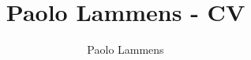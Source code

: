 \documentclass[a4paper, 11pt]{article}
\title{Paolo Lammens - CV}
\author{Paolo Lammens}
\begin{document}
\makeatletter

\newcommand{\ifnn}[2]{\ifthenelse{\equal{#1}{}}{}{#2}}
\newcommand{\showlink}[2][https]{\href{#1:#2}{#2}}

\newcommand{\rendercvemail}{\href{mailto:\cvemail}{\cvemail}}
\newcommand{\rendercvphone}{\textcolor{myorange}{\cvphone}}
\newcommand{\rendercvlinkedin}{\showlink{linkedin.com/in/\cvlinkedin/}}
\newcommand{\rendercvgithub}{\showlink{github.com/\cvgithub}}
\newcommand{\rendercvstackoverflow}{\showlink{stackoverflow.com/story/\cvstackoverflow}}

\newcommand{\cvsectiontitle}[1]{
    \rule{5mm}{0.5mm}\vspace{2mm}
    \section*{\Large\bfseries #1}
}

\newcommand{\cvsectionrule}{\rule{\columnwidth}{0.5mm}\vspace*{5pt}}

\newcommand{\cvchronoitem}[6]{
    {\raggedright\textbf{\ignorespaces#1}\ifnn{#2}{ -- #2}\par}%
    {\textcolor{myorange}{\small\uppercase{\ignorespaces#3 \ifnn{#4}{-- #4} \ifnn{#5}{$\,|\,$ #5}}}%
     \medskip\par}%
    {\setstretch{0.9}\small #6 \par}%
}

\newcommand{\cvsoftwareskills}{}
\newcommand{\addcvsoftwareskill}[2]{
    \g@addto@macro\cvsoftwareskills{\\ #1 \noexpand& #2}
}

\newcommand{\cvlanguages}{}
\newcommand{\addcvlanguage}[2]{
    \g@addto@macro\cvlanguages{\\ #1 \noexpand& #2}
}

\setlength{\tabulinesep}{5pt}
\setlength{\tabcolsep}{10pt}
\thispagestyle{empty}

\setlength{\intextsep}{0.1mm}

\makeatother


\newcommand{\cvemail}{lammenspaolo@gmail.com}
\newcommand{\cvphone}{+34 634412833}
\newcommand{\cvlinkedin}{PaoloLammens}
\newcommand{\cvgithub}{plammens}
\newcommand{\cvstackoverflow}{plammens}

\newcommand{\cvaboutme}{}
\end{document}
